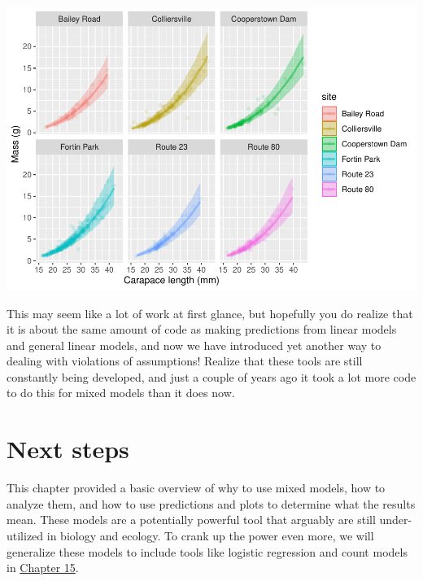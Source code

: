 \documentclass[
]{book}
\begin{document}
\includegraphics{worstr_files/figure-latex/unnamed-chunk-384-1.pdf}

This may seem like a lot of work at first glance, but hopefully you do realize that it is about the same amount of code as making predictions from linear models and general linear models, and now we have introduced yet another way to dealing with violations of assumptions! Realize that these tools are still constantly being developed, and just a couple of years ago it took a lot more code to do this for mixed models than it does now.

\hypertarget{next-14}{%
\section{Next steps}\label{next-14}}

This chapter provided a basic overview of why to use mixed models, how to analyze them, and how to use predictions and plots to determine what the results mean. These models are a potentially powerful tool that arguably are still under-utilized in biology and ecology. To crank up the power even more, we will generalize these models to include tools like logistic regression and count models in \protect\hyperlink{Chapter15}{Chapter 15}.

  
\end{document}
